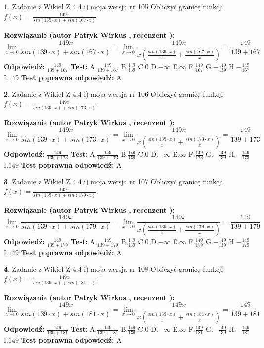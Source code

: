 \documentclass[12pt, a4paper]{article}
\theoremstyle{definition} %
\newtheorem{zad}{}
\newcommand{\zadStart}[1]{\begin{zad}#1\newline}
\newcommand{\zadStop}{\end{zad}}
\newcommand{\rozwStart}[2]{\noindent \textbf{Rozwiązanie (autor #1 , recenzent #2): }\newline}
\newcommand{\rozwStop}{\newline}
\newcommand{\odpStart}{\noindent \textbf{Odpowiedź:}\newline}
\newcommand{\odpStop}{\newline}
\newcommand{\testStart}{\noindent \textbf{Test:}\newline}
\newcommand{\testStop}{\newline}
\newcommand{\kluczStart}{\noindent \textbf{Test poprawna odpowiedź:}\newline}
\newcommand{\kluczStop}{\newline}
\begin{document}
\zadStart{Zadanie z Wikieł Z 4.4 i) moja wersja nr 105}
Obliczyć granicę funkcji $f(x)=\frac{149x}{sin(139\cdot x) +sin(167\cdot x)}$.
\zadStop
\rozwStart{Patryk Wirkus}{}
$$\lim\limits_{x\to 0}\frac{149x}{sin(139\cdot x) +sin(167\cdot x)}=\lim\limits_{x\to 0}\frac{149x}{x(\frac{sin(139\cdot x)}{x}+\frac{sin(167\cdot x)}{x})}=\frac{149}{139+167}$$
\rozwStop
\odpStart
$\frac{149}{139+167}$
\odpStop
\testStart
A.$\frac{149}{139+167}$
B.$\frac{149}{139}$
C.$0$
D.$-\infty$
E.$\infty$
F.$\frac{149}{167}$
G.$-\frac{149}{139}$
H.$-\frac{149}{167}$
I.$149$
\testStop
\kluczStart
A
\kluczStop



\zadStart{Zadanie z Wikieł Z 4.4 i) moja wersja nr 106}
Obliczyć granicę funkcji $f(x)=\frac{149x}{sin(139\cdot x) +sin(173\cdot x)}$.
\zadStop
\rozwStart{Patryk Wirkus}{}
$$\lim\limits_{x\to 0}\frac{149x}{sin(139\cdot x) +sin(173\cdot x)}=\lim\limits_{x\to 0}\frac{149x}{x(\frac{sin(139\cdot x)}{x}+\frac{sin(173\cdot x)}{x})}=\frac{149}{139+173}$$
\rozwStop
\odpStart
$\frac{149}{139+173}$
\odpStop
\testStart
A.$\frac{149}{139+173}$
B.$\frac{149}{139}$
C.$0$
D.$-\infty$
E.$\infty$
F.$\frac{149}{173}$
G.$-\frac{149}{139}$
H.$-\frac{149}{173}$
I.$149$
\testStop
\kluczStart
A
\kluczStop



\zadStart{Zadanie z Wikieł Z 4.4 i) moja wersja nr 107}
Obliczyć granicę funkcji $f(x)=\frac{149x}{sin(139\cdot x) +sin(179\cdot x)}$.
\zadStop
\rozwStart{Patryk Wirkus}{}
$$\lim\limits_{x\to 0}\frac{149x}{sin(139\cdot x) +sin(179\cdot x)}=\lim\limits_{x\to 0}\frac{149x}{x(\frac{sin(139\cdot x)}{x}+\frac{sin(179\cdot x)}{x})}=\frac{149}{139+179}$$
\rozwStop
\odpStart
$\frac{149}{139+179}$
\odpStop
\testStart
A.$\frac{149}{139+179}$
B.$\frac{149}{139}$
C.$0$
D.$-\infty$
E.$\infty$
F.$\frac{149}{179}$
G.$-\frac{149}{139}$
H.$-\frac{149}{179}$
I.$149$
\testStop
\kluczStart
A
\kluczStop



\zadStart{Zadanie z Wikieł Z 4.4 i) moja wersja nr 108}
Obliczyć granicę funkcji $f(x)=\frac{149x}{sin(139\cdot x) +sin(181\cdot x)}$.
\zadStop
\rozwStart{Patryk Wirkus}{}
$$\lim\limits_{x\to 0}\frac{149x}{sin(139\cdot x) +sin(181\cdot x)}=\lim\limits_{x\to 0}\frac{149x}{x(\frac{sin(139\cdot x)}{x}+\frac{sin(181\cdot x)}{x})}=\frac{149}{139+181}$$
\rozwStop
\odpStart
$\frac{149}{139+181}$
\odpStop
\testStart
A.$\frac{149}{139+181}$
B.$\frac{149}{139}$
C.$0$
D.$-\infty$
E.$\infty$
F.$\frac{149}{181}$
G.$-\frac{149}{139}$
H.$-\frac{149}{181}$
I.$149$
\testStop
\kluczStart
A
\kluczStop
\end{document}
